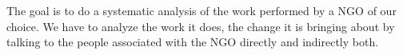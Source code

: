 


\begin{abstracts}        %

The goal is to do a systematic analysis of the work performed by a NGO of our choice. We have to analyze the work it does, the change it is bringing about by talking to the people associated with the NGO directly and indirectly both.

\end{abstracts}




